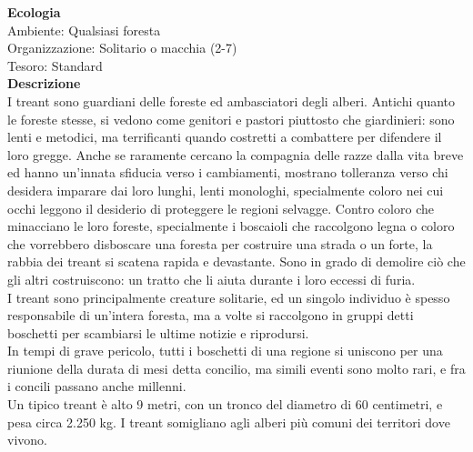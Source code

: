 \begin{multicols}{2}
\textbf{Ecologia}\\
Ambiente: Qualsiasi foresta\\
Organizzazione: Solitario o macchia (2-7)\\
Tesoro: Standard\\
\textbf{Descrizione}\\
I treant sono guardiani delle foreste ed ambasciatori degli alberi. Antichi quanto le foreste stesse, si vedono come genitori e pastori piuttosto che giardinieri: sono lenti e metodici, ma terrificanti quando costretti a combattere per difendere il loro gregge. Anche se raramente cercano la compagnia delle razze dalla vita breve ed hanno un’innata sfiducia verso i cambiamenti, mostrano tolleranza verso chi desidera imparare dai loro lunghi, lenti monologhi, specialmente coloro nei cui occhi leggono il desiderio di proteggere le regioni selvagge. Contro coloro che minacciano le loro foreste, specialmente i boscaioli che raccolgono legna o coloro che vorrebbero disboscare una foresta per costruire una strada o un forte, la rabbia dei treant si scatena rapida e devastante. Sono in grado di demolire ciò che gli altri costruiscono: un tratto che li aiuta durante i loro eccessi di furia.\\

I treant sono principalmente creature solitarie, ed un singolo individuo è spesso responsabile di un’intera foresta, ma a volte si raccolgono in gruppi detti boschetti per scambiarsi le ultime notizie e riprodursi.\\

In tempi di grave pericolo, tutti i boschetti di una regione si uniscono per una riunione della durata di mesi detta concilio, ma simili eventi sono molto rari, e fra i concili passano anche millenni.\\

Un tipico treant è alto 9 metri, con un tronco del diametro di 60 centimetri, e pesa circa 2.250 kg. I treant somigliano agli alberi più comuni dei territori dove vivono.\\


\end{multicols}
